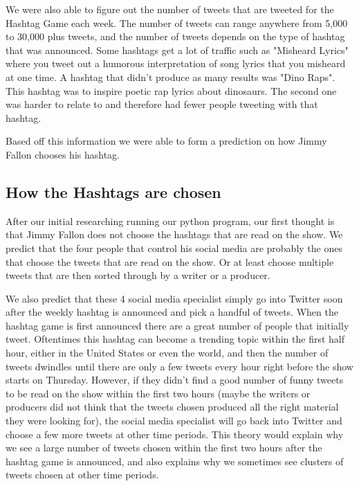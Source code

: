 \documentclass[titlepage]{article}
\begin{document}
We were also able to figure out the number of tweets that are tweeted for the Hashtag Game each week. The number of tweets can range anywhere from 5,000 to 30,000 plus tweets, and the number of tweets depends on the type of hashtag that was announced. Some hashtags get a lot of traffic such as "Misheard Lyrics" where you tweet out a humorous interpretation of song lyrics that you misheard at one time. A hashtag that didn't produce as many results was "Dino Raps". This hashtag was to inspire poetic rap lyrics about dinosaurs. The second one was harder to relate to and therefore had fewer people tweeting with that hashtag. 

Based off this information we were able to form a prediction on how Jimmy Fallon chooses his hashtag.



\subsection{How the Hashtags are chosen}

After our initial researching running our python program, our first thought is that Jimmy Fallon does not choose the hashtags that are read on the show. We predict that the four people that control his social media are probably the ones that choose the tweets that are read on the show. Or at least choose multiple tweets that are then sorted through by a writer or a producer. 

We also predict that these 4 social media specialist simply go into Twitter soon after the weekly hashtag is announced and pick a handful of tweets. When the hashtag game is first announced there are a great number of people that initially tweet. Oftentimes this hashtag can become a trending topic within the first half hour, either in the United States or even the world, and then the number of tweets dwindles until there are only a few tweets every hour right before the show starts on Thursday. However, if they didn't find a good number of funny tweets to be read on the show within the first two hours (maybe the writers or producers did not think that the tweets chosen produced all the right material they were looking for), the social media specialist will go back into Twitter and choose a few more tweets at other time periods. This theory would explain why we see a large number of tweets chosen within the first two hours after the hashtag game is announced, and also explains why we sometimes see clusters of tweets chosen at other time periods.
\end{document}
